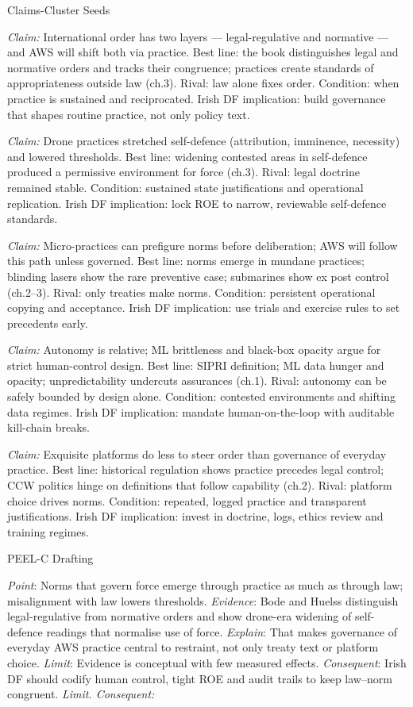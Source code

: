 Claims-Cluster Seeds

\textit{Claim:} International order has two layers — legal-regulative and normative — and AWS will shift both via practice.
Best line: the book distinguishes legal and normative orders and tracks their congruence; practices create standards of appropriateness outside law (ch.3). Rival: law alone fixes order. Condition: when practice is sustained and reciprocated. Irish DF implication: build governance that shapes routine practice, not only policy text.

\textit{Claim:} Drone practices stretched self-defence (attribution, imminence, necessity) and lowered thresholds.
Best line: widening contested areas in self-defence produced a permissive environment for force (ch.3). Rival: legal doctrine remained stable. Condition: sustained state justifications and operational replication. Irish DF implication: lock ROE to narrow, reviewable self-defence standards.

\textit{Claim:} Micro-practices can prefigure norms before deliberation; AWS will follow this path unless governed.
Best line: norms emerge in mundane practices; blinding lasers show the rare preventive case; submarines show ex post control (ch.2–3). Rival: only treaties make norms. Condition: persistent operational copying and acceptance. Irish DF implication: use trials and exercise rules to set precedents early.

\textit{Claim:} Autonomy is relative; ML brittleness and black-box opacity argue for strict human-control design.
Best line: SIPRI definition; ML data hunger and opacity; unpredictability undercuts assurances (ch.1). Rival: autonomy can be safely bounded by design alone. Condition: contested environments and shifting data regimes. Irish DF implication: mandate human-on-the-loop with auditable kill-chain breaks.

\textit{Claim:} Exquisite platforms do less to steer order than governance of everyday practice.
Best line: historical regulation shows practice precedes legal control; CCW politics hinge on definitions that follow capability (ch.2). Rival: platform choice drives norms. Condition: repeated, logged practice and transparent justifications. Irish DF implication: invest in doctrine, logs, ethics review and training regimes.

PEEL-C Drafting

\textit{Point}: Norms that govern force emerge through practice as much as through law; misalignment with law lowers thresholds.
\textit{Evidence}: Bode and Huelss distinguish legal-regulative from normative orders and show drone-era widening of self-defence readings that normalise use of force.
\textit{Explain}: That makes governance of everyday AWS practice central to restraint, not only treaty text or platform choice.
\textit{Limit}: Evidence is conceptual with few measured effects.
\textit{Consequent}: Irish DF should codify human control, tight ROE and audit trails to keep law–norm congruent.
\textit{Limit. Consequent:}

